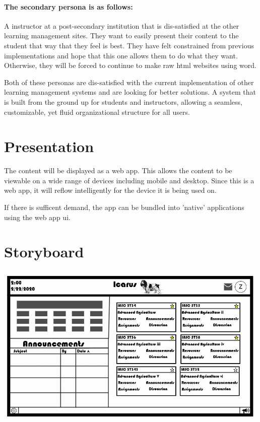 \documentclass[12pt]{article}
\begin{document}
    \paragraph{The secondary persona is as follows:} A instructor at a post-secondary institution that is dis-satisfied at the other learning management sites.
    They want to easily present their content to the student that way that they feel is best.
    They have felt constrained from previous implementations and hope that this one allows them to do what they want.
    Otherwise, they will be forced to continue to make raw html websites using word.

    Both of these personas are dis-satisfied with the current implementation of other learning management systems and are looking for better solutions.
    A system that is built from the ground up for students and instructors, allowing a seamless, customizable, yet fluid organizational structure for all users.


    \section{Presentation}\label{sec:presentation}

    The content will be displayed as a web app.
    This allows the content to be viewable on a wide range of devices including mobile and desktop.
    Since this is a web app, it will reflow intelligently for the device it is being used on.

    If there is sufficent demand, the app can be bundled into 'native' applications using the web app ui.


    \section{Storyboard}\label{sec:storyboard}

    \includegraphics[width=\textwidth]{StoryBoard.jpg}
\end{document}
